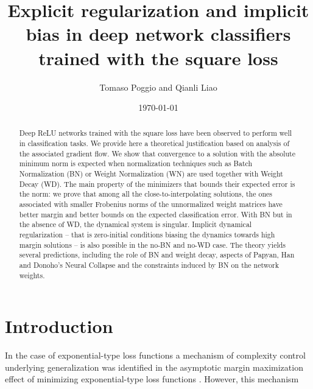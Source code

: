 \documentclass[11pt]{article}
\begin{document}
	\setcounter{page}{1}
	\title{Explicit regularization and implicit bias in  deep
		network classifiers trained with the square loss}
		\author{\large Tomaso Poggio and Qianli Liao}
	\date{\today}
	
	\maketitle
	
	\begin{abstract}
		
          Deep ReLU networks trained  with the square loss have been observed to perform well in
          classification tasks. We provide here a theoretical
          justification based on analysis of the associated gradient
          flow. We show that convergence to a
          solution with the absolute minimum norm is expected when
          normalization techniques such as Batch
          Normalization (BN) or Weight
          Normalization (WN) are used together with Weight Decay
          (WD). The main property of the minimizers
          that bounds their expected error is the norm: we prove that
          among all the close-to-interpolating solutions, the ones associated
          with smaller Frobenius norms of the unnormalized weight matrices have
          better margin and better bounds on the expected
          classification error. With BN but in the absence of WD, the dynamical
          system is singular. Implicit dynamical regularization --
          that is zero-initial conditions biasing the dynamics towards
          high margin solutions -- is also possible in the no-BN and
          no-WD case.  The theory yields several predictions,
          including the role of BN and weight decay, aspects of Papyan,
          Han and Donoho's Neural Collapse and the constraints induced
          by BN on the network weights.

\end{abstract}
	
	
\section{Introduction}


In the case of exponential-type loss functions a mechanism of
complexity control underlying generalization was identified in the asymptotic margin maximization effect of
minimizing exponential-type loss functions
\cite{2019arXiv190507325S,DBLP:journals/corr/abs-1906-05890,
  theory_III}. However, this mechanism
\end{document}
